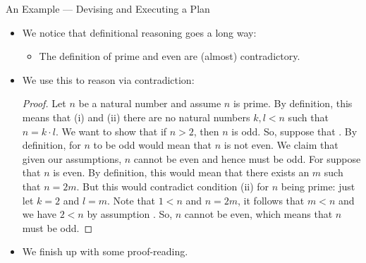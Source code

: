 \begin{frame}{An Example --- Devising and Executing a Plan}

	\begin{itemize}
	
	
		\item We notice that definitional reasoning goes a long way:
		
			\begin{itemize}
			
				\item The definition of prime and even are (almost) contradictory.
			
			\end{itemize}
			
		\item We use this to reason via contradiction:
	
		 \begin{proof}
		{\small Let $n$ be a natural number and assume $n$ is prime. By definition, this means that (i)   and (ii) there are no natural numbers $k,l<n$ such that $n=k\cdot l$. We want to show that if $n>2$, then $n$ is odd. So, suppose that  . By definition, for $n$ to be odd would mean that $n$ is not even. We claim that given our assumptions, $n$ cannot be even and hence must be odd. For suppose that $n$ is even. By definition, this would mean that there exists an $m$ such that $n=2m$. But this would contradict condition (ii) for $n$ being prime: just let $k=2$ and $l=m$. Note that $1<n$ and $n=2m$, it follows that $m<n$ and we have $2<n$ by assumption . So, $n$ cannot be even, which means that $n$ must be odd.}
		\end{proof}
		
	\pause
	
	\item We finish up with some proof-reading.
	
	\end{itemize}


\end{frame}


